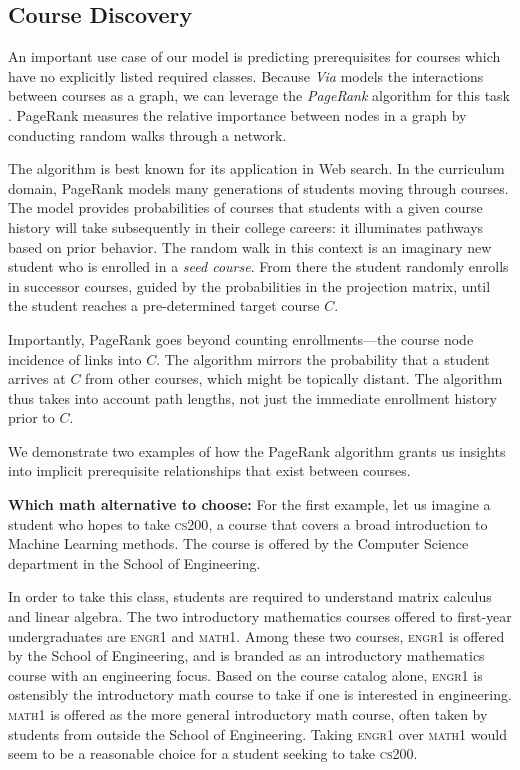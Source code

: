 \subsection{Course Discovery}
An important use case of our model is predicting prerequisites for
courses which have no explicitly listed required classes. Because {\em
  Via} models the interactions between courses as a graph, we can
leverage the {\em PageRank} algorithm for this task
\cite{Page1999}. PageRank measures the relative importance between nodes in a graph by conducting random walks through a network.

The algorithm is best known for its application in Web search. In the
curriculum domain, PageRank models many generations of students moving
through courses. The model provides probabilities of courses that
students with a given course history will take subsequently in their
college careers: it illuminates pathways based on prior
behavior. The random walk in this context is an imaginary new student
who is enrolled in a {\em seed course}. From there the student
randomly enrolls in successor courses, guided by the probabilities in
the projection matrix, until the student reaches a pre-determined
target course $C$.

Importantly, PageRank goes beyond counting enrollments---the course
node incidence of links into $C$. The algorithm mirrors the
probability that a student arrives at $C$ from other courses, which
might be topically distant. The algorithm thus takes into account path
lengths, not just the immediate enrollment history prior to $C$.

We demonstrate two examples of how the PageRank algorithm grants us
insights into implicit prerequisite relationships that exist between
courses.

{\bf Which math alternative to choose:} For the first example, let us imagine a student who hopes to take \textsc{cs200}, a course that covers a broad introduction to Machine Learning methods.  The course is offered by
the Computer Science department in the School of Engineering.

In order to take this class, students are required to understand
matrix calculus and linear algebra. The two introductory mathematics
courses offered to first-year undergraduates are \textsc{engr1} and
\textsc{math1}. Among these two courses, \textsc{engr1} is offered by the School of Engineering, and is branded as an introductory mathematics course with an engineering focus. Based on the course catalog alone, \textsc{engr1} is ostensibly the introductory math course to take if one is interested in engineering. \textsc{math1} is offered as the more general introductory math course, often taken by students from outside the School of Engineering. Taking \textsc{engr1} over \textsc{math1} would seem to be a reasonable choice for a student seeking to take \textsc{cs200}. 

